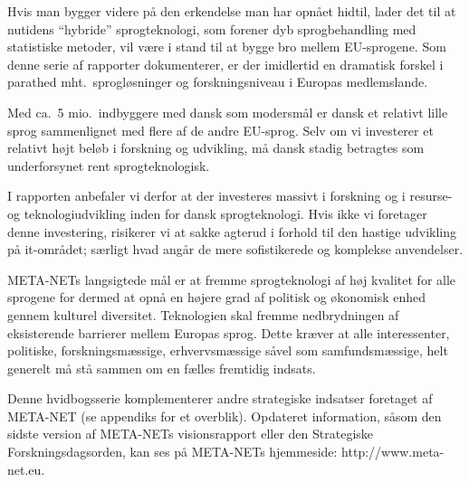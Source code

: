 \begin{multicols}{2}
  
  
 Hvis man bygger videre \mbox{p\aa} den erkendelse man har opn\aa et hidtil, lader det til at nutidens ``hybride'' sprogteknologi, som forener dyb sprogbehandling med statistiske metoder, vil v\ae re i stand til at bygge bro mellem EU-sprogene. Som denne serie af rapporter dokumenterer, er der imidlertid en dramatisk forskel i parathed mht.\ sprogl\o sninger og forskningsniveau i Europas medlemslande.

Med ca.\ 5 mio.\ indbyggere med dansk som modersm\aa l er dansk et relativt lille sprog sammenlignet med flere af de andre EU-sprog. Selv om vi investerer et relativt h\o jt bel\o b i forskning og udvikling, \mbox{m\aa} dansk stadig betragtes som underforsynet rent sprogteknologisk. 

I rapporten anbefaler vi derfor at der investeres massivt i forskning 
og i resurse- og teknologiudvikling inden for dansk sprogteknologi.
Hvis ikke vi foretager denne investering, risikerer vi at sakke agterud i forhold til den hastige udvikling \mbox{p\aa} it-omr\aa det; s\ae rligt hvad ang\aa r de mere sofistikerede og komplekse anvendelser.

META-NETs langsigtede m\aa l er at fremme sprogteknologi af h\o j kvalitet for alle sprogene for dermed at \mbox{opn\aa} en h\o jere grad af politisk og \o konomisk enhed gennem kulturel diversitet. Teknologien skal fremme nedbrydningen af eksisterende barrierer mellem Europas sprog. Dette kr\ae ver at alle interessenter,  politiske, forskningsm\ae ssige, erhvervsm\ae ssige s\aa vel som samfundsm\ae ssige, helt generelt  \mbox{m\aa} \mbox{st\aa} sammen om en f\ae lles fremtidig indsats.

Denne hvidbogsserie komplementerer andre strategiske indsatser foretaget af META-NET (se appendiks for et overblik). Opdateret information, \mbox{s\aa}som den sidste version af META-NETs visionsrapport  \cite{Meta1} eller den Strategiske Forskningsdagsorden, kan ses \mbox{p\aa} META-NETs hjemmeside: http://www.meta-net.eu.


\end{multicols}

\clearpage



